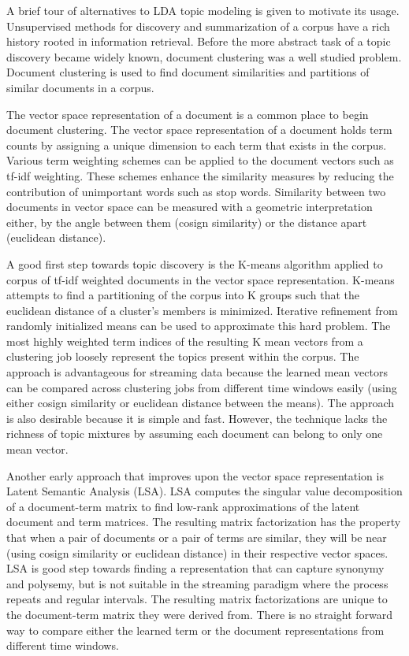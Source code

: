 \documentclass[10pt]{article}
\begin{document}
A brief tour of alternatives to LDA topic modeling is given to motivate its usage.  Unsupervised methods for discovery and summarization of a corpus have a rich history rooted in information retrieval.  Before the more abstract task of a topic discovery became widely known, document clustering was a well studied problem.  Document clustering is used to find document similarities and partitions of similar documents in a corpus.   

The vector space representation of a document is a common place to begin document clustering.  The vector space representation of a document holds term counts by assigning a unique dimension to each term that exists in the corpus.  Various term weighting schemes can be applied to the document vectors such as tf-idf weighting.  These schemes enhance the similarity measures by reducing the contribution of unimportant words such as stop words.  Similarity between two documents in vector space can be measured with a geometric interpretation either, by the angle between them (cosign similarity) or the distance apart (euclidean distance).

A good first step towards topic discovery is the K-means algorithm applied to corpus of tf-idf weighted documents in the vector space representation.  K-means attempts to find a partitioning of the corpus into K groups such that the euclidean distance of a cluster's members is minimized.  Iterative refinement from randomly initialized means can be used to approximate this hard problem.  The most highly weighted term indices of the resulting K mean vectors from a clustering job loosely represent the topics present within the corpus.  The approach is advantageous for streaming data because the learned mean vectors can be compared across clustering jobs from different time windows easily (using either cosign similarity or euclidean distance between the means).  The approach is also desirable because it is simple and fast.  However, the technique lacks the richness of topic mixtures by assuming each document can belong to only one mean vector. 

Another early approach that improves upon the vector space representation is Latent Semantic Analysis (LSA).  LSA computes the singular value decomposition of a document-term matrix to find low-rank approximations of the latent document and term matrices.  The resulting matrix factorization has the property that when a pair of documents or a pair of terms are similar, they will be near (using cosign similarity or euclidean distance) in their respective vector spaces.  LSA is good step towards finding a representation that can capture synonymy and polysemy, but is not suitable in the streaming paradigm where the process repeats and regular intervals.  The resulting matrix factorizations are unique to the document-term matrix they were derived from.  There is no straight forward way to compare either the learned term or the document representations from different time windows.
\end{document}
